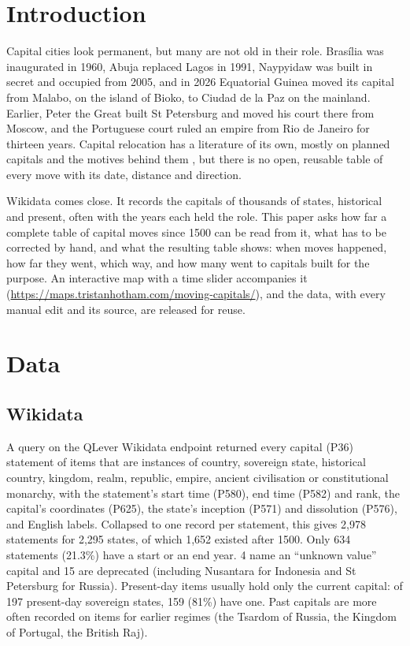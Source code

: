 \documentclass[11pt,a4paper]{article}
\begin{document}
\section{Introduction}
Capital cities look permanent, but many are not old in their role. Brasília was inaugurated in 1960, Abuja replaced Lagos in 1991, Naypyidaw was built in secret and occupied from 2005, and in 2026 Equatorial Guinea moved its capital from Malabo, on the island of Bioko, to Ciudad de la Paz on the mainland. Earlier, Peter the Great built St Petersburg and moved his court there from Moscow, and the Portuguese court ruled an empire from Rio de Janeiro for thirteen years. Capital relocation has a literature of its own, mostly on planned capitals and the motives behind them \citep{rossman,schatz,gordon}, but there is no open, reusable table of every move with its date, distance and direction.

Wikidata \citep{wikidata} comes close. It records the capitals of thousands of states, historical and present, often with the years each held the role. This paper asks how far a complete table of capital moves since 1500 can be read from it, what has to be corrected by hand, and what the resulting table shows: when moves happened, how far they went, which way, and how many went to capitals built for the purpose. An interactive map with a time slider accompanies it (\url{https://maps.tristanhotham.com/moving-capitals/}), and the data, with every manual edit and its source, are released for reuse.

\section{Data}
\subsection{Wikidata}
A query on the QLever Wikidata endpoint \citep{qlever} returned every capital (P36) statement of items that are instances of country, sovereign state, historical country, kingdom, realm, republic, empire, ancient civilisation or constitutional monarchy, with the statement's start time (P580), end time (P582) and rank, the capital's coordinates (P625), the state's inception (P571) and dissolution (P576), and English labels. Collapsed to one record per statement, this gives 2,978 statements for 2,295 states, of which 1,652 existed after 1500. Only 634 statements (21.3\%) have a start or an end year. 4 name an ``unknown value'' capital and 15 are deprecated (including Nusantara for Indonesia and St Petersburg for Russia). Present-day items usually hold only the current capital: of 197 present-day sovereign states, 159 (81\%) have one. Past capitals are more often recorded on items for earlier regimes (the Tsardom of Russia, the Kingdom of Portugal, the British Raj).
\end{document}

